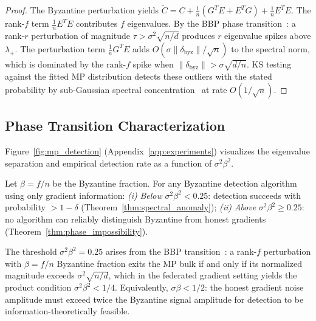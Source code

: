 \begin{proof}
The Byzantine perturbation yields
$\tilde{C} = C + \frac{1}{n}(G^TE + E^TG) + \frac{1}{n}E^TE$.
The rank-$f$ term $\frac{1}{n}E^TE$ contributes $f$ eigenvalues.
By the BBP phase transition~\cite{bbp_transition}: a rank-$r$ perturbation of magnitude
$\tau > \sigma^2\sqrt{n/d}$ produces $r$ eigenvalue spikes above $\lambda_+$.
The perturbation term $\frac{1}{n}G^TE$ adds $O(\sigma\|\delta_{\mathrm{byz}}\|/\sqrt{n})$
to the spectral norm, which is dominated by the rank-$f$ spike when
$\|\delta_{\mathrm{byz}}\| > \sigma\sqrt{d/n}$.
KS testing against the fitted MP distribution detects these outliers with the stated
probability by sub-Gaussian spectral concentration~\cite{bai_silverstein} at rate $O(1/\sqrt{n})$.
\end{proof}

\subsection{Phase Transition Characterization}

Figure~\ref{fig:mp_detection} (Appendix~\ref{app:experiments}) visualizes the eigenvalue
separation and empirical detection rate as a function of $\sigma^2\beta^2$.

\begin{theorem}
\label{thm:phase_transition_det}
Let $\beta = f/n$ be the Byzantine fraction.
For any Byzantine detection algorithm using only gradient information:
\emph{(i)} \emph{Below} $\sigma^2\beta^2 < 0.25$: detection succeeds with probability $> 1 - \delta$
(Theorem~\ref{thm:spectral_anomaly});
\emph{(ii)} \emph{Above} $\sigma^2\beta^2 \geq 0.25$: no algorithm can reliably distinguish
Byzantine from honest gradients (Theorem~\ref{thm:phase_impossibility}).
\end{theorem}

The threshold $\sigma^2\beta^2 = 0.25$ arises from the BBP
transition~\cite{bbp_transition}: a rank-$f$ perturbation with $\beta = f/n$ Byzantine fraction
exits the MP bulk if and only if its normalized magnitude exceeds $\sigma^2\sqrt{n/d}$,
which in the federated gradient setting yields the product condition $\sigma^2\beta^2 < 1/4$.
Equivalently, $\sigma\beta < 1/2$: the honest gradient noise amplitude must exceed twice
the Byzantine signal amplitude for detection to be information-theoretically feasible.
